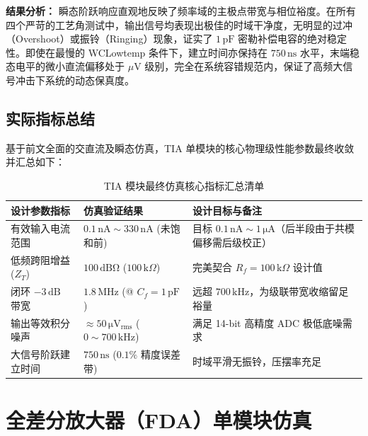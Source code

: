 \textbf{结果分析：} 瞬态阶跃响应直观地反映了频率域的主极点带宽与相位裕度。在所有四个严苛的工艺角测试中，输出信号均表现出极佳的时域干净度，无明显的过冲（Overshoot）或振铃（Ringing）现象，证实了 $1\,\mathrm{pF}$ 密勒补偿电容的绝对稳定性。即使在最慢的 WCLowtemp 条件下，建立时间亦保持在 $750\,\mathrm{ns}$ 水平，末端稳态电平的微小直流偏移处于 $\mu\mathrm{V}$ 级别，完全在系统容错规范内，保证了高频大信号冲击下系统的动态保真度。

\subsection{实际指标总结}
基于前文全面的交直流及瞬态仿真，TIA 单模块的核心物理级性能参数最终收敛并汇总如下：

\begin{table}[H]
\centering
\caption{TIA 模块最终仿真核心指标汇总清单}
\label{tab:tia_final_specs}
\begin{tabular}{lp{6cm}p{6cm}}
\toprule
\textbf{设计参数指标} & \textbf{仿真验证结果} & \textbf{设计目标与备注} \\
\midrule
有效输入电流范围 & $0.1\,\mathrm{nA} \sim 330\,\mathrm{nA}$ (未饱和前) & 目标 $0.1\,\mathrm{nA} \sim 1\,\mathrm{\mu A}$（后半段由于共模偏移需后级校正） \\
低频跨阻增益 ($Z_T$) & $100\,\mathrm{dB\Omega}$ ($100\,\mathrm{k}\Omega$) & 完美契合 $R_f = 100\,\mathrm{k}\Omega$ 设计值 \\
闭环 $-3\,\mathrm{dB}$ 带宽 & $1.8\,\mathrm{MHz}$ (@ $C_f = 1\,\mathrm{pF}$) & 远超 $700\,\mathrm{kHz}$，为级联带宽收缩留足裕量 \\
输出等效积分噪声 & $\approx 50\,\mathrm{\mu V_{rms}}$ ($0 \sim 700\,\mathrm{kHz}$) & 满足 14-bit 高精度 ADC 极低底噪需求 \\
大信号阶跃建立时间 & $750\,\mathrm{ns}$ ($0.1\%$ 精度误差带) & 时域平滑无振铃，压摆率充足 \\
\bottomrule
\end{tabular}
\end{table}


\section{全差分放大器（FDA）单模块仿真}

